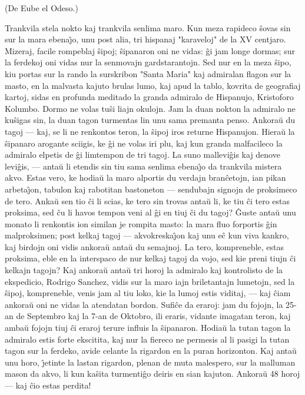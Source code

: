 \begin{center}
\footnotesize (De Eube el Odeso.)
\end{center}

   Trankvila stela nokto kaj trankvila senlima maro. Kun meza rapideco
\^sovas sin sur la mara ebena\^{\j}o, unu post alia, tri hispanaj
"karaveloj" de la XV centjaro. Mizeraj, facile rompeblaj \^sipoj;
\^sipanaron oni ne vidas: \^gi jam longe dormas; sur la ferdekoj oni
vidas nur la senmovajn gardstarantojn. Sed nur en la meza \^sipo,
kiu portas sur la rando la surskribon "Santa Maria" kaj admiralan
flagon sur la masto, en la malvasta kajuto brulas lumo, kaj apud la
tablo, kovrita de geografiaj kartoj, sidas en profunda meditado la
granda admiralo de Hispanujo, Kristoforo Kolumbo. Dormo ne volas
tu\^si liajn okulojn. Jam la duan nokton la admiralo ne ku\^sigas
sin, la duan tagon turmentas lin unu sama premanta penso. Ankora\u u
du tagoj --- kaj, se li ne renkontos teron, la \^sipoj iros returne
Hispanujon. Hiera\u u la \^sipanaro arogante sciigis, ke \^gi ne
volas iri plu, kaj kun granda malfacileco la admiralo elpetis de
\^gi limtempon de tri tagoj. La suno mallevi\^gis kaj denove
levi\^gis, --- anta\u u li etendis sin tiu sama senlima ebena\^{\j}o
da trankvila mistera akvo. Estas vero, ke hodia\u u la maro alportis
du verdajn bran\^cetojn, ian pikan arbeta\^{\j}on, tabulon kaj
rabotitan bastoneton --- sendubajn signojn de proksimeco de tero.
Anka\u u sen tio \^ci li scias, ke tero sin trovas anta\u u li, ke
tiu \^ci tero estas proksima, sed \^cu li havos tempon veni al \^gi
en tiuj \^ci du tagoj? \^Guste anta\u u unu monato li renkontis ion
similan je rompita masto: la mara fluo forportis \^gin malproksimen;
post kelkaj tagoj --- akvokreska\^{\j}on kaj unu e\^c kun viva
kankro, kaj birdojn oni vidis ankora\u u anta\u u du semajnoj. La
tero, kompreneble, estas proksima, eble en la interspaco de nur
kelkaj tagoj da vojo, sed kie preni tiujn \^ci kelkajn tagojn? Kaj
ankora\u u anta\u u tri horoj la admiralo kaj kontrolisto de la
ekspedicio, Rodrigo Sanchez, vidis sur la maro iajn briletantajn
lumetojn, sed la \^sipoj, kompreneble, venis jam al tiu loko, kie la
lumoj estis viditaj, --- kaj \^ciam ankora\u u oni ne vidas la
atendatan bordon. Sufi\^ce da eraroj: jam du fojojn, la 25-an de
Septembro kaj la 7-an de Oktobro, ili eraris, vidante imagatan
teron, kaj amba\u u fojojn tiuj \^ci eraroj terure influis la
\^sipanaron. Hodia\u u la tutan tagon la admiralo estis forte
ekscitita, kaj nur la fiereco ne permesis al li pasigi la tutan
tagon sur la ferdeko, avide celante la rigardon en la puran
horizonton. Kaj anta\u u unu horo, \^{\j}etinte la lastan rigardon,
plenan de muta malespero, sur la malluman mason da akvo, li kun
ka\^sita turmenti\^go deiris en sian kajuton. Ankora\u u 48 horoj
--- kaj \^cio estas perdita!

